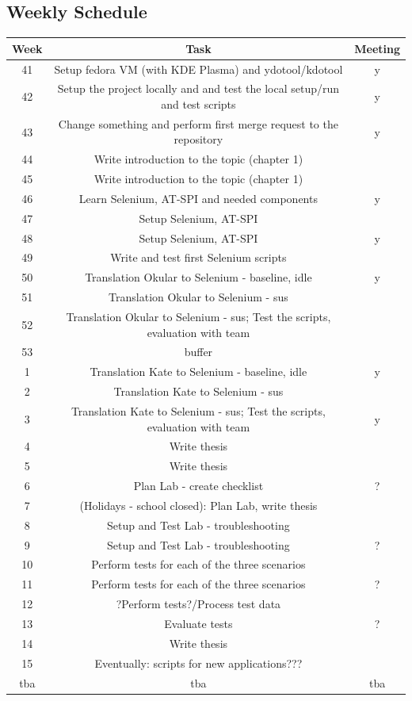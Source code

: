 \documentclass{article}
\begin{document}
\begin{center}
\section*{Weekly Schedule}
\begin{tabular}{ | c | c | c | }
 \hline
 Week & Task & Meeting \\
 \hline\hline
 41  & Setup fedora VM (with KDE Plasma) and ydotool/kdotool & y \\
 \hline
 42  & Setup the project locally and and test the local setup/run and test scripts & y \\
 \hline
 43  & Change something and perform first merge request to the repository & y \\
 \hline
 44  & Write introduction to the topic (chapter 1) & \\
 \hline
 45  & Write introduction to the topic (chapter 1) & \\
 \hline
 46  & Learn Selenium, AT-SPI and needed components & y \\
 \hline
 47  & Setup Selenium, AT-SPI & \\
 \hline
 48  &  Setup Selenium, AT-SPI & y \\
 \hline
 49  &  Write and test first Selenium scripts & \\
 \hline
 50  &  Translation Okular to Selenium - baseline, idle & y \\
 \hline
 51  & Translation Okular to Selenium - sus & \\
 \hline
 52  & Translation Okular to Selenium - sus; Test the scripts, evaluation with team & \\
 \hline
 53  & buffer & \\
 \hline
 1  & Translation Kate to Selenium - baseline, idle & y \\
 \hline
 2  & Translation Kate to Selenium - sus & \\
 \hline
 3  & Translation Kate to Selenium - sus; Test the scripts, evaluation with team & y \\
 \hline
 4  & Write thesis & \\
 \hline
 5  & Write thesis & \\
 \hline
 6  & Plan Lab - create checklist & ? \\
 \hline
 7  & (Holidays - school closed): Plan Lab, write thesis &  \\
 \hline
 8  & Setup and Test Lab - troubleshooting &  \\
 \hline
 9  & Setup and Test Lab - troubleshooting & ? \\
 \hline
 10  & Perform tests for each of the three scenarios & \\
 \hline
 11  & Perform tests for each of the three scenarios & ? \\
 \hline
 12  & ?Perform tests?/Process test data & \\
 \hline
 13 & Evaluate tests & ? \\
 \hline
 14 & Write thesis & \\
 \hline
 15 & Eventually: scripts for new applications??? & \\
 \hline
 tba & tba & tba \\
 \hline

\end{tabular}
\end{center}
\end{document}
